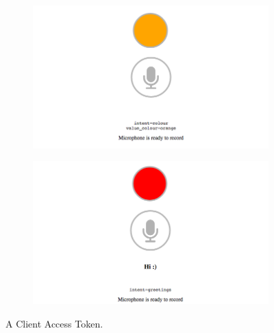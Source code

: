 \documentclass[twoside,11pt]{article}
\begin{document}
\begin{figure}[h]
\begin{center}
	\begin{subfigure}[t]{0.48\columnwidth}
	\begin{center}
   		\includegraphics[width=\columnwidth]{figures/witapp_colour.png}
   		\caption{}
   		\label{fig:colour}
   	\end{center}
   \end{subfigure}
   \hfill
   \begin{subfigure}[t]{0.48\columnwidth}
	\begin{center}
   		\includegraphics[width=\columnwidth]{figures/witapp_greetings.png}
   		\caption{}
   		\label{fig:greeting}
   	\end{center}
   \end{subfigure}
    \caption{A Client Access Token.}
    \label{fig:webwit}
\end{center}
\end{figure}
\end{document}
